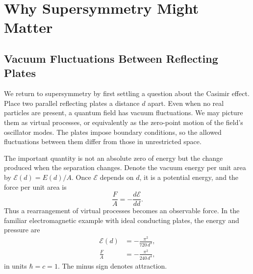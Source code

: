 \chapter{Why Supersymmetry Might Matter}


\section{Vacuum Fluctuations Between Reflecting Plates}

We return to supersymmetry by first settling a question about the Casimir effect. Place two parallel reflecting plates a distance \(d\) apart. Even when no real particles are present, a quantum field has vacuum fluctuations. We may picture them as virtual processes, or equivalently as the zero-point motion of the field's oscillator modes. The plates impose boundary conditions, so the allowed fluctuations between them differ from those in unrestricted space.

The important quantity is not an absolute zero of energy but the change produced when the separation changes. Denote the vacuum energy per unit area by \(\mathcal E(d)=E(d)/A\). Once \(\mathcal E\) depends on \(d\), it is a potential energy, and the force per unit area is
\begin{equation}
\frac{F}{A}=-\frac{d\mathcal E}{dd}.
\end{equation}
Thus a rearrangement of virtual processes becomes an observable force. In the familiar electromagnetic example with ideal conducting plates, the energy and pressure are
\begin{align}
\mathcal E(d)&=-\frac{\pi^2}{720\,d^3},\\
\frac{F}{A}&=-\frac{\pi^2}{240\,d^4},
\end{align}
in units \(\hbar=c=1\). The minus sign denotes attraction.


